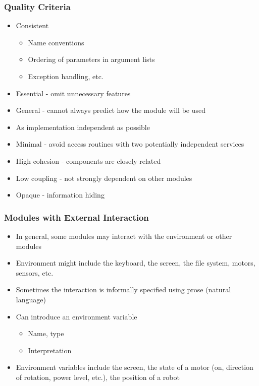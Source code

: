 \documentclass[t,12pt,numbers,fleqn,handout]{beamer}
\begin{document}
\begin{frame}

\frametitle{Quality Criteria \cite[p.\ 83]{HoffmanAndStrooper1995}}

\begin{itemize}
\item Consistent
\begin{itemize}
\item Name conventions
\item Ordering of parameters in argument lists
\item Exception handling, etc.
\end{itemize}
\item Essential - omit unnecessary features
\item General - cannot always predict how the module will be used
\item As implementation independent as possible
\item Minimal - avoid access routines with two potentially independent services
\item High cohesion - components are closely related
\item Low coupling - not strongly dependent on other modules
\item Opaque - information hiding
\end{itemize}

\end{frame}


\begin{frame}
\frametitle{Modules with External Interaction}

\begin{itemize}
\item In general, some modules may interact with the environment or other modules
\item Environment might include the keyboard, the screen, the file system, motors, sensors, etc.
\item Sometimes the interaction is informally specified using prose (natural language)
\item Can introduce an environment variable
\begin{itemize}
\item Name, type
\item Interpretation
\end{itemize}
\item Environment variables include the screen, the state of a motor (on, direction of rotation, power level, etc.),
the position of a robot

\end{itemize}

\end{frame}
\end{document}
